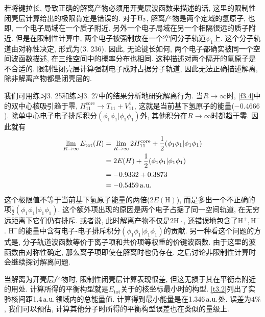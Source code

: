 若将键拉长, 
导致正确的解离产物必须用开壳层波函数来描述的话, 
这里的限制性闭壳层计算给出的极限肯定是错误的. 
对于$\mathrm{H}_2$, 
解离产物是两个定域的氢原子, 
也即, 
一个电子局域在一个质子附近. 
另外一个电子局域在另一个相隔很远的质子附近. 
但是在限制性计算中, 
两个电子被强制放在一个空间分子轨道$\psi_1$上. 
这个分子轨道由对称性决定, 
形式为(3.
236). 
因此, 
无论键长如何, 
两个电子都确实被同一个空间波函数描述, 
在三维空间中的概率分布也相同. 
这种描述对两个隔开的氢原子是不合适的. 
限制性闭壳层\hft 计算强制电子成对占据分子轨道, 
因此无法正确描述解离, 
除非解离产物都是闭壳层的.


我们可用练习3.
25和练习3.
27中的结果分析地研究解离行为. 
当$R\to\infty$时, 
\ref{f3.4}中的双中心核吸引趋于零, 
$H_{11}^\mathrm{core}\to T_{11}+V_{11}^1$, 
这就是当前基下氢原子的能量($-0.4666$). 
除单中心电子电子排斥积分$(\phi_1\phi_1|\phi_1\phi_1)$外, 
其他积分在$R\to \infty$时都趋于零. 
因此就有
\begin{align*}
	\lim_{R\to\infty} E_\mathrm{tot}(R) & = \lim_{R\to\infty} 2H_{11}^\mathrm{core} + \frac{1}{2}(\phi_1\phi_1|\phi_1\phi_1) \\
	& = 2E(H) + \frac{1}{2}(\phi_1\phi_1|\phi_1\phi_1)                                   \\
	& = -0.9332 + 0.3873                                                                 \\
	& = -0.5459\,\mathrm{a.u.}
\end{align*}
这个极限值不等于当前基下氢原子能量的两倍($2E(\mathrm{H})$), 
而是多出一个不正确的项$\frac{1}{2}(\phi_1\phi_1|\phi_1\phi_1)$. 
这个额外项出现的原因是两个电子占据了同一空间轨道, 
在无穷远距离下它们仍有排斥. 
或者说, 此时解离产物不仅是$2\mathrm{H}\cdot$, 
还错误地包含了$\mathrm{H}^+,\mathrm{H}^-$. 
$\mathrm{H}^-$的能量中含有电子-电子排斥积分$(\phi_1\phi_1|\phi_1\phi_1)$的贡献. 
另一种看这个问题的方式是, 
分子轨道波函数等价于离子项和共价项等权重的价键波函数. 
由于这里的波函数由对称性确定, 
那么离子项即使在解离时也仍存在. 
之后讨论非限制性\hft 计算时会继续探讨解离问题.


当解离为开壳层产物时, 
限制性闭壳层\hft 计算表现很差, 
但这无损于其在平衡点附近的用处. 
计算所得的平衡构型就是$E_\mathrm{tot}$关于的核坐标最小时的构型. 
\ref{t3.2}列出了实验核间距$1.4\,\mathrm{a.u.}$领域内的总能量值. 
计算得到最小能量是在$1.346\,\mathrm{a.u.}$处. 
误差为$4\%$, 
我们可以预估, 
计算其他分子时所得的平衡构型误差也在类似的量级上. 

